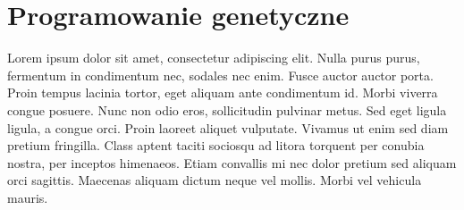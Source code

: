 %
%
%
%

\section{Programowanie genetyczne}
Lorem ipsum dolor sit amet, consectetur adipiscing elit. Nulla purus purus, fermentum in condimentum nec, sodales nec enim. Fusce auctor auctor porta. Proin tempus lacinia tortor, eget aliquam ante condimentum id. Morbi viverra congue posuere. Nunc non odio eros, sollicitudin pulvinar metus. Sed eget ligula ligula, a congue orci. Proin laoreet aliquet vulputate. Vivamus ut enim sed diam pretium fringilla. Class aptent taciti sociosqu ad litora torquent per conubia nostra, per inceptos himenaeos. Etiam convallis mi nec dolor pretium sed aliquam orci sagittis. Maecenas aliquam dictum neque vel mollis. Morbi vel vehicula mauris.

